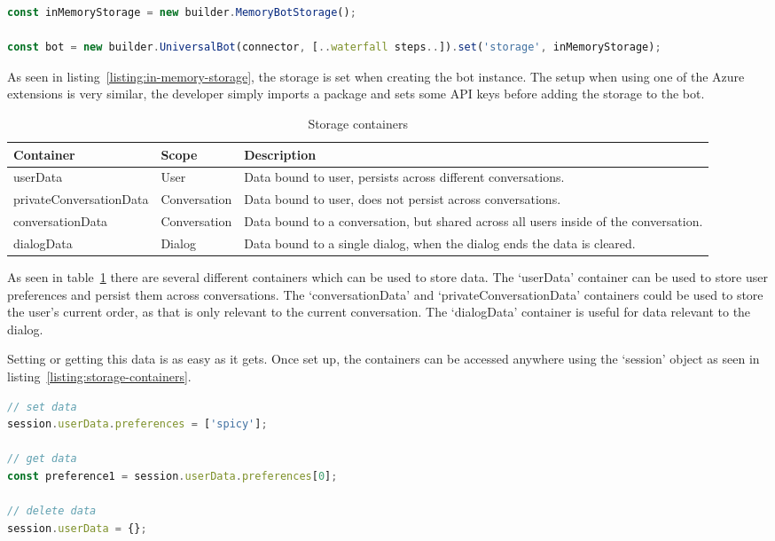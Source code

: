 \begin{lstlisting}[language=JavaScript,caption={Example on how to set up the in-memory data storage},label={listing:in-memory-storage}]
const inMemoryStorage = new builder.MemoryBotStorage();

const bot = new builder.UniversalBot(connector, [..waterfall steps..]).set('storage', inMemoryStorage);
\end{lstlisting}

As seen in listing~\ref{listing:in-memory-storage}, the storage is set when creating the bot instance. The setup when using one of the Azure extensions is very similar, the developer simply imports a package and sets some API keys before adding the storage to the bot.

\begin{table}[h]
	\centering
	\begin{tabular}{p{} | p{} | p{}}
		Container               & Scope        & Description                                                                           \\
		\hline
		userData                & User         & Data bound to user, persists across different conversations.                          \\
		privateConversationData & Conversation & Data bound to user, does not persist across conversations.                            \\
		conversationData        & Conversation & Data bound to a conversation, but shared across all users inside of the conversation. \\
		dialogData              & Dialog       & Data bound to a single dialog, when the dialog ends the data is cleared.
	\end{tabular}
	\caption{Storage containers}
	\label{tab:storage-containers}
\end{table}

As seen in table~\ref{tab:storage-containers} there are several different containers which can be used to store data. The `userData' container can be used to store user preferences and persist them across conversations. The `conversationData' and `privateConversationData' containers could be used to store the user's current order, as that is only relevant to the current conversation. The `dialogData' container is useful for data relevant to the dialog.

Setting or getting this data is as easy as it gets. Once set up, the containers can be accessed anywhere using the `session' object as seen in listing~\ref{listing:storage-containers}.

\begin{lstlisting}[language=JavaScript,caption={Example on how to use the storage containers},label={listing:storage-containers}]
// set data
session.userData.preferences = ['spicy']; 

// get data
const preference1 = session.userData.preferences[0];

// delete data
session.userData = {};
\end{lstlisting}
